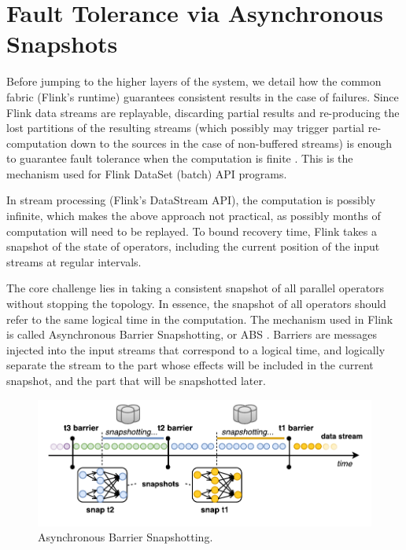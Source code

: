 

\section{Fault Tolerance via Asynchronous Snapshots}
\label{sec:snapshots}
Before jumping to the higher layers of the system, we detail how the common fabric (Flink’s runtime) guarantees consistent results in the case of failures. Since Flink data streams are replayable, discarding partial results and re-producing the lost partitions of the resulting streams (which possibly may trigger partial re-computation down to the sources in the case of non-buffered streams) is enough to guarantee fault tolerance when the computation is finite \cite{DBLP:conf/hotcloud/ZahariaCFSS10}. This is the mechanism used for Flink DataSet (batch) API programs.

In stream processing (Flink’s DataStream API), the computation is possibly infinite, which makes the above approach not practical, as possibly months of computation will need to be replayed. To bound recovery time, Flink takes a snapshot of the state of operators, including the current position of the input streams at regular intervals.

The core challenge lies in taking a consistent snapshot of all parallel operators without stopping the topology. In essence, the snapshot of all operators should refer to the same logical time in the computation. The mechanism used in Flink is called Asynchronous Barrier Snapshotting, or ABS \cite{carbone2015lightweight}. Barriers are messages injected into the input streams that correspond to a logical time, and logically separate the stream to the part whose effects will be included in the current snapshot, and the part that will be snapshotted later.

\begin{figure}[ht]
	\centering  	
  	\includegraphics[width=.75\textwidth]{figs/snaps.pdf}
  	\vspace{-4mm}
	\caption{Asynchronous Barrier Snapshotting.}
	\vspace{-2mm}
	\label{fig:FlinkStack}
\end{figure}

